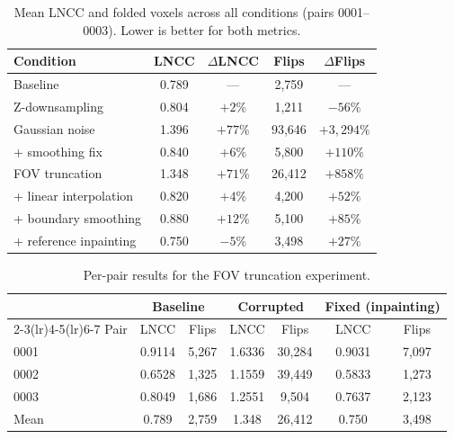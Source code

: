 \documentclass[11pt]{article}
\begin{document}
\begin{table}[H]
  \centering
  \caption{Mean LNCC and folded voxels across all conditions
           (pairs 0001--0003). Lower is better for both metrics.}
  \label{tab:summary}
  \setlength{\tabcolsep}{7pt}
  \begin{tabular}{@{}lcccc@{}}
    \toprule
    Condition & LNCC & $\Delta$LNCC & Flips & $\Delta$Flips \\
    \midrule
    Baseline & 0.789 & --- & 2{,}759 & --- \\
    Z-downsampling & 0.804 & $+2\%$ & 1{,}211 & $-56\%$ \\
    Gaussian noise & 1.396 & $+77\%$ & 93{,}646 & $+3{,}294\%$ \\
    \quad + smoothing fix & 0.840 & $+6\%$ & 5{,}800 & $+110\%$ \\
    FOV truncation & 1.348 & $+71\%$ & 26{,}412 & $+858\%$ \\
    \quad + linear interpolation & 0.820 & $+4\%$ & 4{,}200 & $+52\%$ \\
    \quad + boundary smoothing & 0.880 & $+12\%$ & 5{,}100 & $+85\%$ \\
    \quad + reference inpainting & 0.750 & $-5\%$ & 3{,}498 & $+27\%$ \\
    \bottomrule
  \end{tabular}
\end{table}

\begin{table}[H]
  \centering
  \caption{Per-pair results for the FOV truncation experiment.}
  \label{tab:fov_fix}
  \begin{tabular}{@{}lcccccc@{}}
    \toprule
    & \multicolumn{2}{c}{Baseline} & \multicolumn{2}{c}{Corrupted}
    & \multicolumn{2}{c}{Fixed (inpainting)} \\
    \cmidrule(lr){2-3}\cmidrule(lr){4-5}\cmidrule(lr){6-7}
    Pair & LNCC & Flips & LNCC & Flips & LNCC & Flips \\
    \midrule
    0001 & 0.9114 & 5{,}267  & 1.6336 & 30{,}284 & 0.9031 & 7{,}097 \\
    0002 & 0.6528 & 1{,}325  & 1.1559 & 39{,}449 & 0.5833 & 1{,}273 \\
    0003 & 0.8049 & 1{,}686  & 1.2551 &  9{,}504 & 0.7637 & 2{,}123 \\
    \midrule
    Mean & 0.789  & 2{,}759  & 1.348  & 26{,}412 & 0.750  & 3{,}498 \\
    \bottomrule
  \end{tabular}
\end{table}
\end{document}
